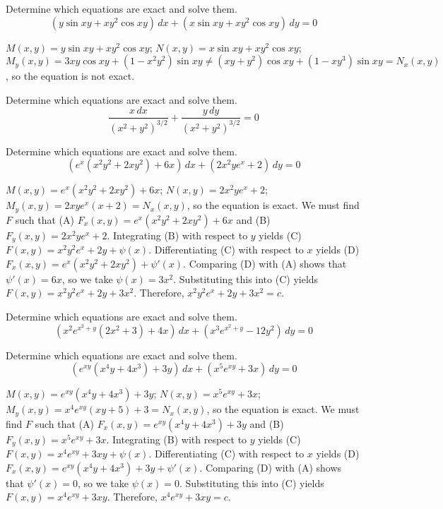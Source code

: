 \documentclass{ximera}
\begin{document}
\begin{problem}\label{exer:2.5.12} Determine which equations are exact and solve them.
$$(y\sin xy+xy^2\cos xy)\,dx+(x\sin xy+xy^2\cos xy)\,dy=0$$



\begin{solution}
    $M(x,y)=y\sin xy+xy^2\cos xy$;\;
$N(x,y)=x\sin xy+xy^2\cos xy$;\;
$M_y(x,y)=3xy\cos xy+(1-x^2y^2)\sin xy\neq (xy+y^2)\cos
xy+(1-xy^3)\sin xy=N_x(x,y)$, so the equation is not exact.
\end{solution}
\end{problem}

\begin{problem}\label{exer:2.5.13} Determine which equations are exact and solve them.
$$\frac{x\,dx}{(x^2+y^2)^{3/2}}+\frac{y\,dy}{(x^2+y^2)^{3/2}}=0$$
\end{problem}

\begin{problem}\label{exer:2.5.14} Determine which equations are exact and solve them.
$$\left(e^x(x^2y^2+2xy^2)+6x\right)\,dx+(2x^2ye^x+2)\,dy=0$$



\begin{solution}
    $M(x,y)=e^x(x^2y^2+2xy^2)+6x$;\;
$N(x,y)=2x^2ye^x+2$;\;
$M_y(x,y)=2xye^x(x+2)=N_x(x,y)$,
so the  equation is  exact.
We must find $F$ such that
(A) $F_x(x,y)=e^x(x^2y^2+2xy^2)+6x$ and
(B) $F_y(x,y)=2x^2ye^x+2$.
Integrating (B) with respect to $y$ yields
(C) $F(x,y)=x^2y^2e^x+2y+\psi(x)$.
Differentiating (C) with respect to $x$  yields
(D) $F_x(x,y)=e^x(x^2y^2+2xy^2)+\psi'(x)$.
Comparing (D) with (A)  shows that
$\psi'(x)=6x$, so we take
$\psi(x)=3x^2$.
Substituting this into (C) yields
$F(x,y)=x^2y^2e^x+2y+3x^2$.
Therefore, $x^2y^2e^x+2y+3x^2=c$.
\end{solution}
\end{problem}

\begin{problem}\label{exer:2.5.15} Determine which equations are exact and solve them.
$$\left(x^2e^{x^2+y}(2x^2+3)+4x\right)\,dx+(x^3e^{x^2+y}-12y^2)\,dy=0$$
\end{problem}

\begin{problem}\label{exer:2.5.16} Determine which equations are exact and solve them.
$$\left(e^{xy}(x^4y+4x^3)+3y\right)\,dx+(x^5e^{xy}+3x)\,dy=0$$



\begin{solution}
    $M(x,y)=e^{xy}(x^4y+4x^3)+3y$;\;
$N(x,y)=x^5e^{xy}+3x$;\;
$M_y(x,y)=x^4e^{xy}(xy+5)+3=N_x(x,y)$,
so the  equation is  exact.
We must find $F$ such that
(A) $F_x(x,y)=e^{xy}(x^4y+4x^3)+3y$ and
(B) $F_y(x,y)=x^5e^{xy}+3x$.
Integrating (B) with respect to $y$ yields
(C) $F(x,y)=x^4e^{xy}+3xy+\psi(x)$.
Differentiating (C) with respect to $x$  yields
(D) $F_x(x,y)=e^{xy}(x^4y+4x^3)+3y+\psi'(x)$.
Comparing (D) with (A)  shows that
$\psi'(x)=0$, so we take
$\psi(x)=0$.
Substituting this into (C) yields
$F(x,y)=x^4e^{xy}+3xy$.
Therefore,  $x^4e^{xy}+3xy=c$.
\end{solution}
\end{problem}
\end{document}
